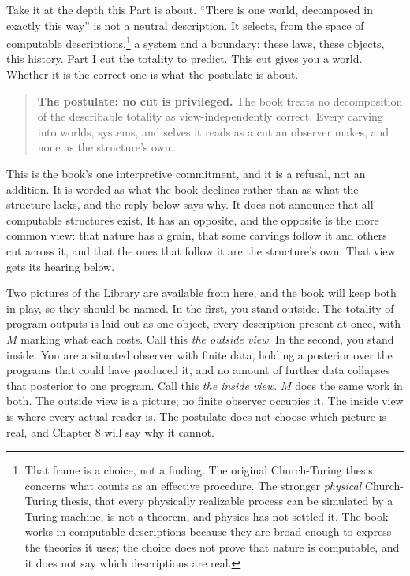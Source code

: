 Take it at the depth this Part is about. ``There is one world, decomposed in exactly this way'' is not a neutral description. It selects, from the space of computable descriptions,\footnote{That frame is a choice, not a finding. The original Church-Turing thesis concerns what counts as an effective procedure. The stronger \emph{physical} Church-Turing thesis, that every physically realizable process can be simulated by a Turing machine, is not a theorem, and physics has not settled it. The book works in computable descriptions because they are broad enough to express the theories it uses; the choice does not prove that nature is computable, and it does not say which descriptions are real.} a system and a boundary: these laws, these objects, this history. Part I cut the totality to predict. This cut gives you a world. Whether it is the correct one is what the postulate is about.

\begin{quote}
\textbf{The postulate: no cut is privileged.} The book treats no decomposition of the describable totality as view-independently correct. Every carving into worlds, systems, and selves it reads as a cut an observer makes, and none as the structure's own.
\end{quote}

This is the book's one interpretive commitment, and it is a refusal, not an addition. It is worded as what the book declines rather than as what the structure lacks, and the reply below says why. It does not announce that all computable structures exist. It has an opposite, and the opposite is the more common view: that nature has a grain, that some carvings follow it and others cut across it, and that the ones that follow it are the structure's own. That view gets its hearing below.

Two pictures of the Library are available from here, and the book will keep both in play, so they should be named. In the first, you stand outside. The totality of program outputs is laid out as one object, every description present at once, with $M$ marking what each costs. Call this \emph{the outside view}. In the second, you stand inside. You are a situated observer with finite data, holding a posterior over the programs that could have produced it, and no amount of further data collapses that posterior to one program. Call this \emph{the inside view}. $M$ does the same work in both. The outside view is a picture; no finite observer occupies it. The inside view is where every actual reader is. The postulate does not choose which picture is real, and Chapter 8 will say why it cannot.

